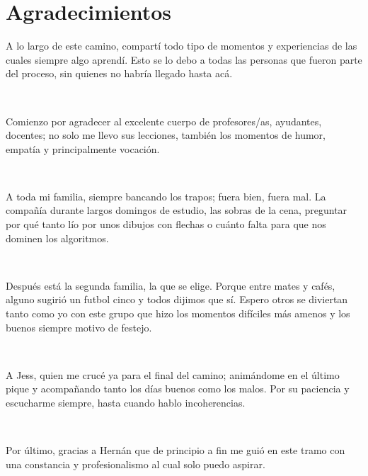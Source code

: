 \chapter*{Agradecimientos}

\noindent A lo largo de este camino, compartí todo tipo de momentos y
experiencias de las cuales siempre algo aprendí. Esto se lo debo a todas las
personas que fueron parte del proceso, sin quienes no habría llegado hasta acá.

~

\noindent Comienzo por agradecer al excelente cuerpo de profesores/as,
ayudantes, docentes; no solo me llevo sus lecciones, también los momentos de
humor, empatía y principalmente vocación.

~

\noindent A toda mi familia, siempre bancando los trapos; fuera bien, fuera mal. La
compañía durante largos domingos de estudio, las sobras de la cena, preguntar
por qué tanto lío por unos dibujos con flechas o cuánto falta para que nos
dominen los algoritmos.

~

\noindent Después está la segunda familia, la que se elige. Porque entre mates
y cafés, alguno sugirió un futbol cinco y todos dijimos que sí. Espero otros se
diviertan tanto como yo con este grupo que hizo los momentos difíciles más
amenos y los buenos siempre motivo de festejo.

~

\noindent A Jess, quien me crucé ya para el final del camino; animándome en el
último pique y acompañando tanto los días buenos como los malos. Por su
paciencia y escucharme siempre, hasta cuando hablo incoherencias.

~

\noindent Por último, gracias a Hernán que de principio a fin me guió en este
tramo con una constancia y profesionalismo al cual solo puedo aspirar.

